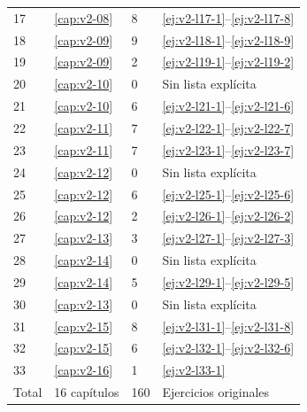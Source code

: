 {\begin{longtable}{@{}p{}p{}p{}p{}@{}}
17 & \ref{cap:v2-08} & 8 & \ref{ej:v2-l17-1}--\ref{ej:v2-l17-8} \\
18 & \ref{cap:v2-09} & 9 & \ref{ej:v2-l18-1}--\ref{ej:v2-l18-9} \\
19 & \ref{cap:v2-09} & 2 & \ref{ej:v2-l19-1}--\ref{ej:v2-l19-2} \\
20 & \ref{cap:v2-10} & 0 & Sin lista explícita \\
21 & \ref{cap:v2-10} & 6 & \ref{ej:v2-l21-1}--\ref{ej:v2-l21-6} \\
22 & \ref{cap:v2-11} & 7 & \ref{ej:v2-l22-1}--\ref{ej:v2-l22-7} \\
23 & \ref{cap:v2-11} & 7 & \ref{ej:v2-l23-1}--\ref{ej:v2-l23-7} \\
24 & \ref{cap:v2-12} & 0 & Sin lista explícita \\
25 & \ref{cap:v2-12} & 6 & \ref{ej:v2-l25-1}--\ref{ej:v2-l25-6} \\
26 & \ref{cap:v2-12} & 2 & \ref{ej:v2-l26-1}--\ref{ej:v2-l26-2} \\
27 & \ref{cap:v2-13} & 3 & \ref{ej:v2-l27-1}--\ref{ej:v2-l27-3} \\
28 & \ref{cap:v2-14} & 0 & Sin lista explícita \\
29 & \ref{cap:v2-14} & 5 & \ref{ej:v2-l29-1}--\ref{ej:v2-l29-5} \\
30 & \ref{cap:v2-13} & 0 & Sin lista explícita \\
31 & \ref{cap:v2-15} & 8 & \ref{ej:v2-l31-1}--\ref{ej:v2-l31-8} \\
32 & \ref{cap:v2-15} & 6 & \ref{ej:v2-l32-1}--\ref{ej:v2-l32-6} \\
33 & \ref{cap:v2-16} & 1 & \ref{ej:v2-l33-1} \\
\midrule Total & 16 capítulos & 160 & Ejercicios originales \\
\bottomrule
\end{longtable}
}

